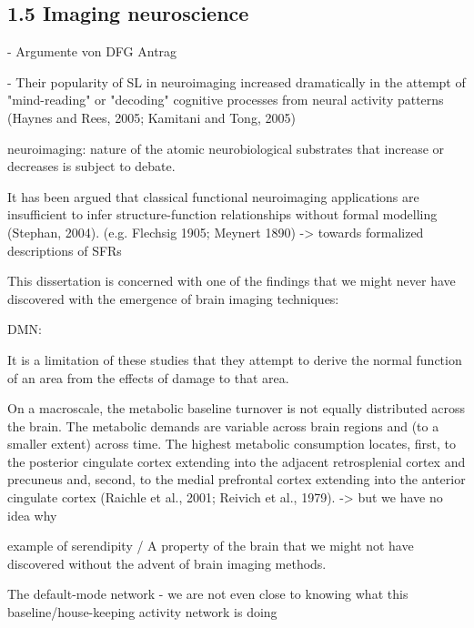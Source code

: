 \documentclass[authoryear,review,3p]{elsarticle}
\begin{document}
\subsection*{1.5 Imaging neuroscience}



- Argumente von DFG Antrag



- Their popularity of SL in neuroimaging increased dramatically in the attempt of "mind-reading" or "decoding" cognitive processes from neural activity patterns (Haynes and Rees, 2005; Kamitani and Tong, 2005)


neuroimaging: nature of the atomic neurobiological substrates
that increase or decreases is subject to debate.



It has been argued that classical functional neuroimaging applications
are insufficient to infer structure-function relationships
without formal modelling (Stephan, 2004).
(e.g. Flechsig 1905; Meynert 1890)
-> towards formalized descriptions of SFRs


This dissertation is concerned with one of the findings that
we might never have discovered with the emergence of
brain imaging techniques:

DMN:

It is a limitation of these studies that they attempt to derive the normal function of an area from the effects of damage to that area.

On a macroscale, the metabolic baseline turnover is not equally distributed across the brain. The metabolic demands are variable across brain regions and (to a smaller extent) across time. The highest metabolic consumption locates, first, to the posterior cingulate cortex extending into the adjacent retrosplenial cortex and precuneus and, second, to the medial prefrontal cortex extending into the anterior cingulate cortex (Raichle et al., 2001; Reivich et al., 1979).
-> but we have no idea why


example of serendipity / A property of the brain that we might not have
discovered without the advent of brain imaging methods.

The default-mode network - we are not even close to knowing
what this baseline/house-keeping activity network is doing
\end{document}
